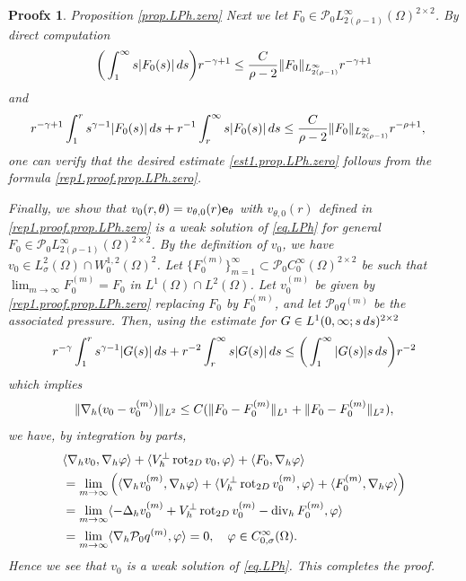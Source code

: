 \documentclass[10pt,a4paper]{amsart}
\newtheorem{proofx}{Proofx}
\newcommand{\dd}{\,{\rm d}}
\newcommand{\h}{{\rm h}}
\newcommand{\opdiv}{\operatorname{div}}
\newcommand{\oprot}{\operatorname{rot}}
\begin{document}
\begin{proofx}{Proposition \ref{prop.LPh.zero}}
Next we let $F_0\in {\mathcal P}_0 L^\infty_{2(\rho-1)}(\Omega)^{2\times2}$. By direct computation 
%
\begin{align*}
\begin{split}
\bigg(\int_{1}^{\infty} 
s |F_0(s)| \dd s 
\bigg) 
r^{-\gamma+1} 
\le 
\frac{C}{\rho-2} 
\|F_0\|_{L^\infty_{2(\rho-1)}} 
r^{-\gamma+1} 
\end{split}
\end{align*}
%
and 
%
\begin{align*}
\begin{split}
&r^{-\gamma+1} 
\int_1^r 
s^{\gamma-1} |F_0(s)| \dd s 
+ r^{-1} 
\int_{r}^{\infty}
s |F_0(s)| \dd s 
\le 
\frac{C}{\rho-2} 
\|F_0\|_{L^\infty_{2(\rho-1)}} 
r^{-\rho+1}, 
\end{split}
\end{align*}
%
one can verify that the desired estimate 
\eqref{est1.prop.LPh.zero} follows from the formula \eqref{rep1.proof.prop.LPh.zero}. 


Finally, we show that $v_0(r,\theta)=v_{\theta,0}(r) {\bf e}_\theta$ with $v_{\theta,0}(r)$ defined in \eqref{rep1.proof.prop.LPh.zero} is a weak solution of \eqref{eq.LPh} for general $F_0\in {\mathcal P}_0 L^\infty_{2(\rho-1)}(\Omega)^{2\times2}$. By the definition of $v_0$, we have $v_0\in L^2_{\sigma}(\Omega)\cap W^{1,2}_0(\Omega)^2$. Let $\{F^{(m)}_0\}_{m=1}^\infty\subset {\mathcal P}_0 C^\infty_0(\Omega)^{2\times2}$ be such that $\displaystyle{\lim_{m\to\infty} F^{(m)}_0 = F_0}$ in $L^1(\Omega)\cap L^2(\Omega)$. Let $v^{(m)}_0$ be given by \eqref{rep1.proof.prop.LPh.zero} replacing $F_0$ by $F^{(m)}_0$, and let ${\mathcal P}_0 q^{(m)}$ be the associated pressure. Then, using the estimate for $G\in L^1(0,\infty; s\dd s)^{2\times2}$ 
%
\begin{align*}
r^{-\gamma} 
\int_1^r 
s^{\gamma-1} |G(s)| \dd s 
+ r^{-2} 
\int_{r}^{\infty}
s |G(s)| \dd s 
\le
\bigg(\int_{1}^{\infty} |G(s)| s\dd s\bigg) r^{-2}
\end{align*}
%
which implies 
\[
\|\nabla_\h (v_0-v^{(m)}_0)\|_{L^2} 
\le 
C(\|F_0-F^{(m)}_0\|_{L^1} + \|F_0-F^{(m)}_0\|_{L^2}),
\]
we have, by integration by parts, 
%
\begin{align*}
\begin{split}
&\langle \nabla_\h v_0, \nabla_\h \varphi \rangle 
+ \langle V_\h^\bot \oprot_{{\rm 2D}} v_0, \varphi \rangle 
+ \langle F_0, \nabla_\h \varphi \rangle \\
&= 
\lim_{m\to\infty}
\Big(
\langle \nabla_\h v^{(m)}_0, \nabla_\h \varphi \rangle
+ \langle V_\h^\bot \oprot_{{\rm 2D}} v^{(m)}_0, \varphi \rangle
+ \langle F^{(m)}_0, \nabla_\h \varphi \rangle
\Big) \\
&= \lim_{m\to\infty} 
\langle 
-\Delta_\h v^{(m)}_0 
+ V_\h^\bot \oprot_{{\rm 2D}} v^{(m)}_0 
- \opdiv_\h F^{(m)}_0, \varphi \rangle \\
&= \lim_{m\to\infty} 
\langle \nabla_\h {\mathcal P}_0 q^{(m)}, \varphi \rangle = 0, 
\quad 
\varphi\in C^\infty_{0,\sigma}(\Omega). 
\end{split}
\end{align*}
%
Hence we see that $v_0$ is a weak solution of \eqref{eq.LPh}. This completes the proof. 
\end{proofx}
\end{document}
